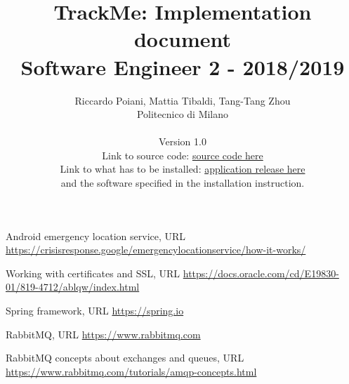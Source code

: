 \documentclass[a4paper]{article}
\begin{document}
\title{TrackMe: Implementation document \\Software Engineer 2 - 2018/2019}
\author{
        Riccardo Poiani, Mattia Tibaldi, Tang-Tang Zhou \\
        Politecnico di Milano\\\\ 
        Version 1.0 \\
        Link to source code:
        \href{https://github.com/tangtang95/PoianiTibaldiZhou/tree/master/Implementation}{source code here}\\
	    Link to what has to be installed:
	     \href{https://github.com/tangtang95/PoianiTibaldiZhou/releases}{application release here}\\ and the software specified in the installation instruction.\\
}
\maketitle
\newpage
\tableofcontents
\newpage













\newpage

\begin{thebibliography}{9}

Android emergency location service, URL \url{https://crisisresponse.google/emergencylocationservice/how-it-works/}

Working with certificates and SSL, URL \url{https://docs.oracle.com/cd/E19830-01/819-4712/ablqw/index.html}

Spring framework, URL \url{https://spring.io}

RabbitMQ, URL \url{https://www.rabbitmq.com}

RabbitMQ concepts about exchanges and queues, URL \url{https://www.rabbitmq.com/tutorials/amqp-concepts.html}

\end{thebibliography}
\end{document}
